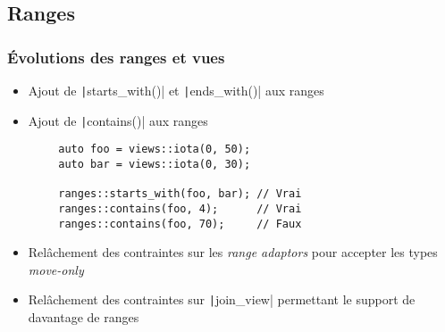 \documentclass[C++.tex]{subfiles}
\begin{document}
\subsection*{Ranges}
\begin{frame}[fragile]
	\frametitle{Évolutions des ranges et vues}
	\begin{itemize}
		\item Ajout de \texttt|starts_with()| et \texttt|ends_with()| aux ranges
		\item Ajout de \texttt|contains()| aux ranges
	\end{itemize}

	\begin{verbatim}
		auto foo = views::iota(0, 50);
		auto bar = views::iota(0, 30);

		ranges::starts_with(foo, bar); // Vrai
		ranges::contains(foo, 4);      // Vrai
		ranges::contains(foo, 70);     // Faux
	\end{verbatim}

	\begin{itemize}
		\item Relâchement des contraintes sur les \textit{range adaptors} pour accepter les types \textit{move-only}
		\item Relâchement des contraintes sur \texttt|join_view| permettant le support de davantage de ranges

	\end{itemize}


\end{frame}
\end{document}
